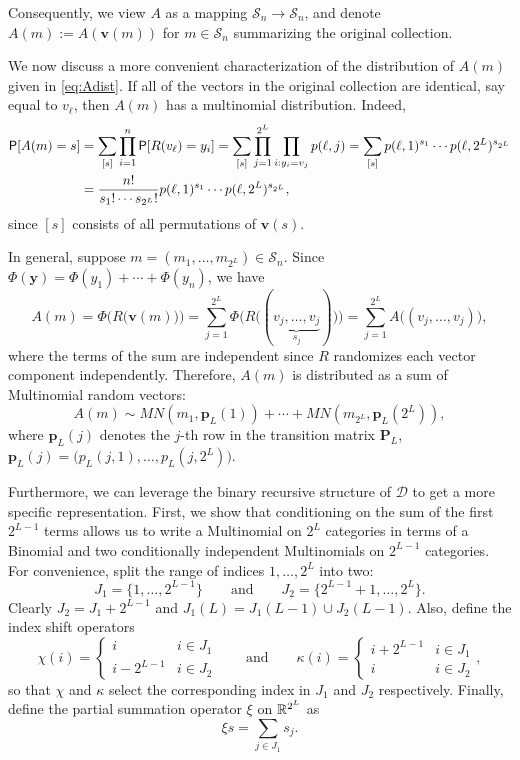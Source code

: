 \documentclass[11pt,draft]{article}
\newcommand{\Dsp}{\mathcal{D}}
\newcommand{\Ssp}{\mathcal{S}}
\newcommand{\yv}{\mathbf{y}}
\newcommand{\vv}{\mathbf{v}}
\newcommand{\pv}{\mathbf{p}}
\newcommand{\Pm}{\mathbf{P}}
\begin{document}
Consequently, we view $A$ as a mapping $\Ssp_n \rightarrow \Ssp_n$, and denote
$A(m) := A(\vv(m))$ for $m\in\Ssp_n$ summarizing the original collection.


We now discuss a more convenient characterization of the distribution of $A(m)$
given in \eqref{eq:Adist}.
If all of the vectors in the original collection are identical, say equal to
$v_\ell$, then $A(m)$ has a multinomial distribution.
Indeed,
\begin{align*}
\P[A(m) = s] &= \sum_{[s]} \prod_{i=1}^n \P[R(v_\ell) = y_i] =
\sum_{[s]} \prod_{j = 1}^{2^L}\prod_{i: y_i = v_j} p(\ell, j) =
\sum_{[s]} p(\ell, 1)^{s_1}\cdots p(\ell, 2^L)^{s_{2^L}} \\
&= \frac{n!}{s_1!\cdots s_{2^L}!} p(\ell, 1)^{s_1}\cdots p(\ell, 2^L)^{s_{2^L}},
\end{align*}
since $[s]$ consists of all permutations of $\vv(s)$.

In general, suppose $m = (m_1,\dots,m_{2^L})\in\Ssp_n$.
Since $\Phi(\yv) = \Phi(y_1) + \cdots + \Phi(y_n)$, we have
\[ A(m) = \Phi\big(R\big(\vv(m)\big)\big) =
\sum_{j=1}^{2^L} \Phi\big(R\big((\underbrace{v_j,\dots,v_j}_{s_j})\big)\big) =
\sum_{j=1}^{2^L} A\big((v_j,\dots,v_j)\big), \]
where the terms of the sum are independent since $R$ randomizes each vector
component independently.
Therefore, $A(m)$ is distributed as a sum of Multinomial random vectors:
\begin{equation} \label{eq:Adistmn}
A(m) \sim MN(m_1, \pv_L(1)) + \cdots + MN(m_{2^L}, \pv_L(2^L)),
\end{equation}
where $\pv_L(j)$ denotes the $j$-th row in the transition matrix
$\Pm_L$, \ie $\pv_L(j) = \big(p_L(j,1),\dots,p_L(j,2^L)\big)$.

Furthermore, we can leverage the binary recursive structure of $\Dsp$ to get a
more specific representation.
First, we show that conditioning on the sum of the first $2^{L-1}$ terms allows
us to write a Multinomial on $2^L$ categories in terms of a Binomial and two
conditionally independent Multinomials on $2^{L-1}$ categories.
For convenience, split the range of indices $1,\dots,2^L$ into two:
\[ J_1 = \big\{1,\dots,2^{L-1}\big\}\qquad\text{and}\qquad
J_2 = \big\{2^{L-1} + 1,\dots,2^L \big\}. \]
Clearly $J_2 = J_1 + 2^{L-1}$ and $J_1(L) = J_1(L-1) \cup J_2(L-1)$.
Also, define the index shift operators
\[ \chi(i) = \begin{cases} i & i \in J_1 \\ i - 2^{L-1} & i \in J_2
\end{cases} \qquad\text{and}\qquad
\kappa(i) = \begin{cases} i + 2^{L-1} & i \in J_1 \\ i & i \in J_2
\end{cases}, \]
so that $\chi$ and $\kappa$ select the corresponding index in $J_1$ and
$J_2$ respectively.
Finally, define the partial summation operator $\xi$ on $\R^{2^L}$ as
\[ \xi s = \sum_{j \in J_1} s_j. \]
\end{document}
